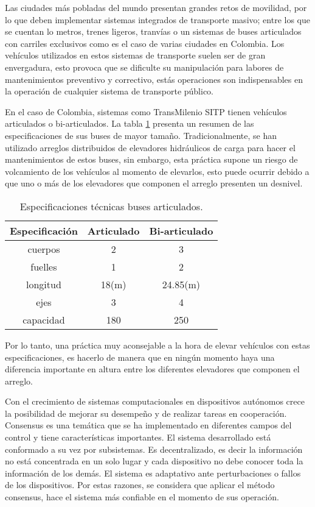 Las ciudades más pobladas del mundo presentan grandes retos de movilidad, por lo que deben implementar sistemas integrados de transporte masivo; entre los que se cuentan lo metros, trenes ligeros, tranvías o un sistemas de buses articulados con carriles exclusivos como es el caso de varias ciudades en Colombia.
Los vehículos utilizados en estos sistemas de transporte suelen ser de gran envergadura, esto provoca que se dificulte su manipulación para labores de mantenimientos preventivo y correctivo, estás operaciones son indispensables en la operación de cualquier sistema de transporte público.

En el caso de Colombia, sistemas como TransMilenio SITP tienen vehículos articulados o bi-articulados. La tabla \ref{table:busesTM} presenta un resumen de las especificaciones de sus buses de mayor tamaño. Tradicionalmente, se han utilizado arreglos distribuidos de elevadores hidráulicos de carga para hacer el mantenimientos de estos buses, sin embargo, esta práctica supone un riesgo de volcamiento de los vehículos al momento de elevarlos, esto puede ocurrir debido a que uno o más de los elevadores que componen el arreglo presenten un desnivel.

\begin{table}[h]
	\centering
	\begin{tabular}{|c|c|c|}
		\hline
			Especificación&Articulado&Bi-articulado\\\hline
			cuerpos&2&3\\
			fuelles&1&2\\
			longitud&18(m)&24.85(m)\\
			ejes&3&4\\
			capacidad&180&250\\
		\hline
	\end{tabular}
	\caption{Especificaciones técnicas buses articulados.}
	\label{table:busesTM}
\end{table}

Por lo tanto, una  práctica muy aconsejable a la hora de elevar vehículos con estas especificaciones, es hacerlo de manera que en ningún momento haya una diferencia importante en altura entre los diferentes elevadores que componen el arreglo.

Con el crecimiento de sistemas computacionales en dispositivos autónomos crece la posibilidad  de mejorar su desempeño y de realizar tareas en cooperación. Consensus es una temática que se ha implementado en diferentes campos del control y tiene características  importantes. El sistema desarrollado está conformado a su vez por subsistemas. Es decentralizado, es decir la información no está concentrada en un solo lugar y cada dispositivo no debe conocer toda la información de los demás. El sistema es adaptativo ante perturbaciones o fallos de los dispositivos. 
Por estas razones, se considera que aplicar el método consensus, hace el sistema más confiable en el momento de sus operación.